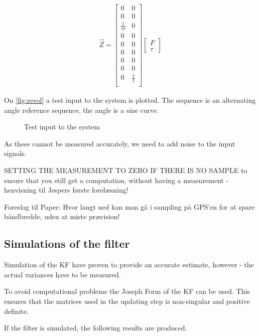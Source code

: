 \begin{align}
\vec{Z} = \begin{bmatrix}
0 & 0\\
0 & 0\\
\frac{1}{m} & 0\\
0 & 0\\
0 & 0\\
0 & 0\\
0 & 0\\
0 & 0\\
0 & \frac{1}{I}\\
\end{bmatrix}\begin{bmatrix}
F\\
\tau
\end{bmatrix}
\end{align}



On \vref{fig:revol} a test input to the system is plotted. The sequence is an alternating angle reference sequence, the angle is a sine curve. 
\begin{figure}[htbp]
	\centering
	\caption{Test input to the system}
	\label{fig:revol}
\end{figure}

As these cannot be measured accurately, we need to add noise to the input signals.

SETTING THE MEASUREMENT TO ZERO IF THERE IS NO SAMPLE to ensure that you still get a computation, without having a measurement - henvisning til Jespers første forelæsning!

Foreslag til Paper: Hvor langt ned kan man gå i sampling på GPS'en for at spare båndbredde, uden at miste præcision!

\subsection{Simulations of the filter}
Simulation of the \ac{KF} have proven to provide an accurate estimate, however - the actual variances have to be measured. 

To avoid computational problems the Joseph Form of the \ac{KF} can be used. This ensures that the matrices used in the updating step is non-singular and positive definite. 

If the filter is simulated, the following results are produced. 




